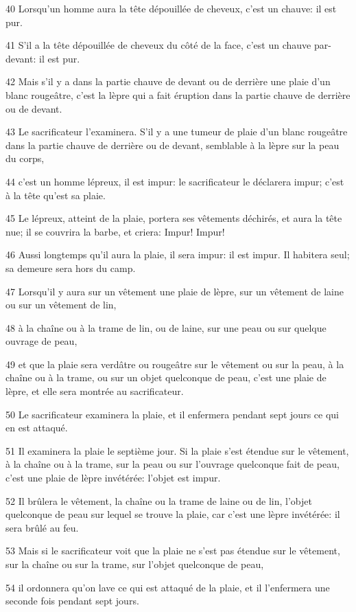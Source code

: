 \par 40 Lorsqu'un homme aura la tête dépouillée de cheveux, c'est un chauve: il est pur.
\par 41 S'il a la tête dépouillée de cheveux du côté de la face, c'est un chauve par-devant: il est pur.
\par 42 Mais s'il y a dans la partie chauve de devant ou de derrière une plaie d'un blanc rougeâtre, c'est la lèpre qui a fait éruption dans la partie chauve de derrière ou de devant.
\par 43 Le sacrificateur l'examinera. S'il y a une tumeur de plaie d'un blanc rougeâtre dans la partie chauve de derrière ou de devant, semblable à la lèpre sur la peau du corps,
\par 44 c'est un homme lépreux, il est impur: le sacrificateur le déclarera impur; c'est à la tête qu'est sa plaie.
\par 45 Le lépreux, atteint de la plaie, portera ses vêtements déchirés, et aura la tête nue; il se couvrira la barbe, et criera: Impur! Impur!
\par 46 Aussi longtemps qu'il aura la plaie, il sera impur: il est impur. Il habitera seul; sa demeure sera hors du camp.
\par 47 Lorsqu'il y aura sur un vêtement une plaie de lèpre, sur un vêtement de laine ou sur un vêtement de lin,
\par 48 à la chaîne ou à la trame de lin, ou de laine, sur une peau ou sur quelque ouvrage de peau,
\par 49 et que la plaie sera verdâtre ou rougeâtre sur le vêtement ou sur la peau, à la chaîne ou à la trame, ou sur un objet quelconque de peau, c'est une plaie de lèpre, et elle sera montrée au sacrificateur.
\par 50 Le sacrificateur examinera la plaie, et il enfermera pendant sept jours ce qui en est attaqué.
\par 51 Il examinera la plaie le septième jour. Si la plaie s'est étendue sur le vêtement, à la chaîne ou à la trame, sur la peau ou sur l'ouvrage quelconque fait de peau, c'est une plaie de lèpre invétérée: l'objet est impur.
\par 52 Il brûlera le vêtement, la chaîne ou la trame de laine ou de lin, l'objet quelconque de peau sur lequel se trouve la plaie, car c'est une lèpre invétérée: il sera brûlé au feu.
\par 53 Mais si le sacrificateur voit que la plaie ne s'est pas étendue sur le vêtement, sur la chaîne ou sur la trame, sur l'objet quelconque de peau,
\par 54 il ordonnera qu'on lave ce qui est attaqué de la plaie, et il l'enfermera une seconde fois pendant sept jours.
